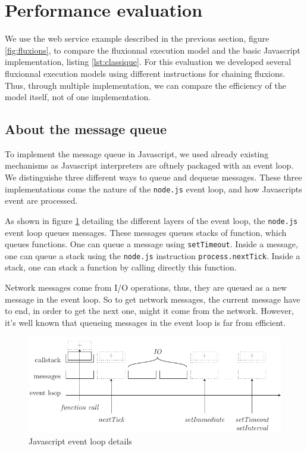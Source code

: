 \section{Performance evaluation}

We use the web service example described in the previous section, figure \ref{fig:fluxions}, to compare the fluxionnal execution model and the basic Javascript implementation, listing \ref{lst:classique}.
For this evaluation we developed several fluxionnal execution models using different instructions for chaining fluxions.
Thus, through multiple implementation, we can compare the efficiency of the model itself, not of one implementation.

\subsection{About the message queue}

To implement the message queue in Javascript, we used already existing mechanisms as Javascript interpreters are oftnely packaged with an event loop.
We distinguishe three different ways to queue and dequeue messages. These three implementations come the nature of the \texttt{node.js} event loop, and how Javascripts event are processed.

As shown in figure \ref{fig:eventloop} detailing the different layers of the event loop, the \texttt{node.js} event loop queues messages.
These messages queues stacks of function, which queues functions.
One can queue a message using \texttt{setTimeout}.
Inside a message, one can queue a stack using the \texttt{node.js} instruction \texttt{process.nextTick}.
Inside a stack, one can stack a function by calling directly this function.

Network messages come from I/O operations, thus, they are queued as a new message in the event loop.
So to get network messages, the current message have to end, in order to get the next one, might it come from the network.
However, it's well known that queueing messages in the event loop is far from efficient.

\begin{figure}[h!]
  \includegraphics[width=\linewidth]{eventloop.pdf}
  \caption{Javascript event loop details}
  \label{fig:eventloop}
\end{figure}

